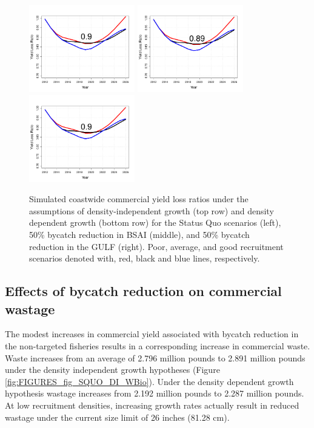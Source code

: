 \begin{figure}[htbp]
		\includegraphics[height=1.5in]{../FIGURES/YLR/fig_SQUO_DD_ylr.pdf}
		\includegraphics[height=1.5in]{../FIGURES/YLR/fig_BSAI_DD_ylr.pdf}
		\includegraphics[height=1.5in]{../FIGURES/YLR/fig_GULF_DD_ylr.pdf}		
	\caption{Simulated coastwide commercial yield loss ratios under the assumptions of density-independent growth (top row) and density dependent growth (bottom row) for the Status Quo scenarios (left), 50\% bycatch reduction in BSAI (middle), and 50\% bycatch reduction in the GULF (right).  Poor, average, and good recruitment scenarios denoted with, red, black and blue lines, respectively.}
	\label{fig:FIGURES_YLR_fig_SQUO_DI_ylr}
\end{figure}

\subsection{Effects of bycatch reduction on commercial wastage} %
\label{sub:effects_of_bycatch_reduction_on_commercial_wastage}

The modest increases in commercial yield associated with bycatch reduction in the non-targeted fisheries results in a corresponding increase in commercial waste.  Waste increases from an average of 2.796 million pounds to 2.891 million pounds under the density independent growth hypotheses (Figure \ref{fig:FIGURES_fig_SQUO_DI_WBio}).  Under the density dependent growth hypothesis wastage increases from 2.192 million pounds to 2.287 million pounds.  At low recruitment densities, increasing growth rates actually result in reduced wastage under the current size limit of 26 inches (81.28 cm).

